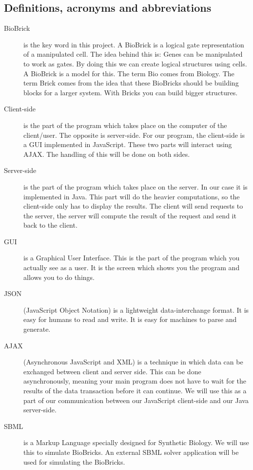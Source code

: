 \documentclass[a4paper]{article}
\begin{document}
\subsection{Definitions, acronyms and abbreviations}
\begin{description}
        \item[BioBrick] is the key word in this project. A BioBrick is a logical gate representation of a manipulated cell. The idea behind this is: Genes can be manipulated to work as gates. By doing this we can create logical structures using cells. A BioBrick is a model for this. The term Bio comes from Biology. The term Brick comes from the idea that these BioBricks should be building blocks for a larger system. With Bricks you can build bigger structures.  
        \item[Client-side] is the part of the program which takes place on the computer of the client/user. The opposite is server-side. For our program, the client-side is a GUI implemented in JavaScript. These two parts will interact using AJAX. The handling of this will be done on both sides. 
        \item[Server-side]  is the part of the program which takes place on the server. In our case it is implemented in Java. This part will do the heavier computations, so the client-side only has to display the results. The client will send requests to the server, the server will compute the result of the request and send it back to the client.
        \item[GUI] is a Graphical User Interface. This is the part of the program which you actually see as a user. It is the screen which shows you the program and allows you to do things. 
        \item[JSON] (JavaScript Object Notation) is a lightweight data-interchange format. It is easy for humans to read and write. It is easy for machines to parse and generate.
        \item[AJAX] (Asynchronous JavaScript and XML) is a technique in which data can be exchanged between client and server side. This can be done asynchronously, meaning your main program does not have to wait for the results of the data transaction before it can continue. We will use this as a part of our communication between our JavaScript client-side and our Java server-side.
        \item[SBML] is a Markup Language specially designed for Synthetic Biology. We will use this to simulate BioBricks. An external SBML solver application will be used for simulating the BioBricks.
\end{description}
\end{document}

